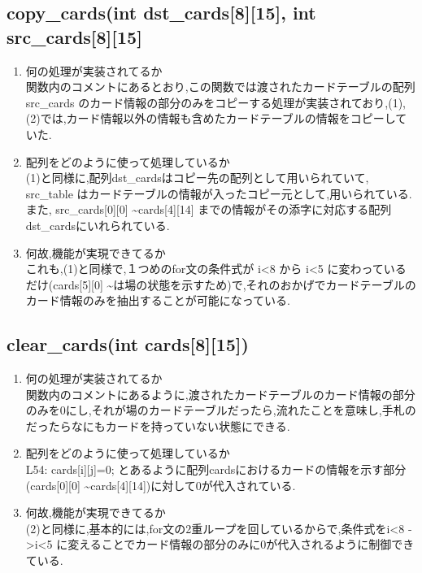 \documentclass{jsarticle}
\begin{document}
\subsection{copy\_cards(int dst\_cards[8][15], int src\_cards[8][15]}
\begin{enumerate}
  \item  何の処理が実装されてるか\\
  関数内のコメントにあるとおり,この関数では渡されたカードテーブルの配列src\_cards のカード情報の部分のみをコピーする処理が実装されており,(1),(2)では,カード情報以外の情報も含めたカードテーブルの情報をコピーしていた.

  \item  配列をどのように使って処理しているか\\
  (1)と同様に,配列dst\_cardsはコピー先の配列として用いられていて, src\_table はカードテーブルの情報が入ったコピー元として,用いられている. また, src\_cards[0][0] \textasciitilde   cards[4][14] までの情報がその添字に対応する配列dst\_cardsにいれられている.

  \item  何故,機能が実現できてるか\\
  これも,(1)と同様で,１つめのfor文の条件式が i\textless 8 から i\textless 5 に変わっているだけ(cards[5][0] \textasciitilde   は場の状態を示すため)で,それのおかげでカードテーブルのカード情報のみを抽出することが可能になっている.
\end{enumerate}


\subsection{ clear\_cards(int cards[8][15])}
\begin{enumerate}
  \item  何の処理が実装されてるか\\
  関数内のコメントにあるように,渡されたカードテーブルのカード情報の部分のみを0にし,それが場のカードテーブルだったら,流れたことを意味し,手札のだったらなにもカードを持っていない状態にできる.
  \item  配列をどのように使って処理しているか\\
  L54: cards[i][j]=0; とあるように配列cardsにおけるカードの情報を示す部分(cards[0][0] \textasciitilde   cards[4][14])に対して0が代入されている.
  \item  何故,機能が実現できてるか\\
  (2)と同様に,基本的には,for文の2重ループを回しているからで,条件式をi\textless 8 -\textgreater  i\textless 5 に変えることでカード情報の部分のみに0が代入されるように制御できている.

\end{enumerate}
\end{document}
